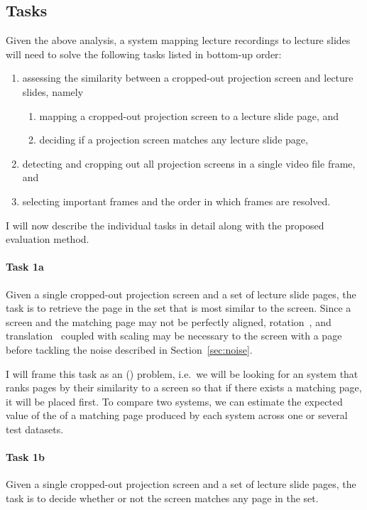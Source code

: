 \subsection{Tasks}
\label{sec:tasks}
Given the above analysis, a system mapping lecture recordings to lecture slides
will need to solve the following tasks listed in bottom-up order:
\begin{enumerate}
  \item assessing the similarity between a cropped-out projection screen and
    lecture slides, namely
    \begin{enumerate}
      \item mapping a cropped-out projection screen to a lecture slide page, and
      \item deciding if a projection screen matches any lecture slide page,
    \end{enumerate}
  \item detecting and cropping out all projection screens in a single video
    file frame, and
  \item selecting important frames and the order in which frames are resolved.
\end{enumerate}
I will now describe the individual tasks in detail along with the proposed
evaluation method.

\paragraph{Task 1a} Given a single cropped-out projection screen and a set of
lecture slide pages, the task is to retrieve the page in the set that is most
similar to the screen. Since a screen and the matching page may not be
perfectly aligned, rotation~\cite{smith1995simple}, and
translation~\cite{sarvaiyaetal09} coupled with scaling may be necessary to
 the screen with a page before tackling the noise described in
Section~\ref{sec:noise}.

I will frame this task as an  () problem,
i.e.\ we will be looking for an  system that ranks pages by their
similarity to a screen so that if there exists a matching page, it will be
placed first. To compare two systems, we can estimate the expected value of the
 of a matching page produced by each system across one or several
test datasets.

\paragraph{Task 1b} Given a single cropped-out projection screen and a set of
lecture slide pages, the task is to decide whether or not the screen matches
any page in the set.

